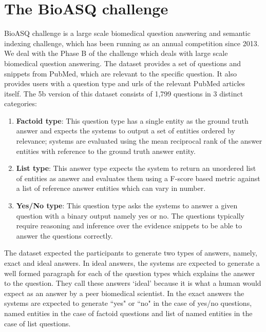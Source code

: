 \documentclass[11pt,a4paper]{article}
\begin{document}
\section{The BioASQ challenge}
\label{Dataset}
BioASQ challenge \cite{bioasq} is a large scale biomedical question answering and semantic indexing challenge, which has been running as an annual competition since 2013. %
We deal with the Phase B of the challenge which deals with large scale biomedical question answering. The dataset provides a set of questions and snippets from PubMed, which are relevant to the specific question. It also provides users with a question type and urls of the relevant PubMed articles itself. The 5b version of this dataset consists of 1,799 questions in 3 distinct categories:
\begin{enumerate}
    \item \textbf{Factoid type}: This question type has a single entity as the ground truth answer and expects the systems to output a set of  entities ordered by relevance; systems are evaluated using the mean reciprocal rank \cite{MRR} of the answer entities with reference to the ground truth answer entity.
    \item \textbf{List type}: This answer type expects the system to return an unordered list of entities as answer and evaluates them using a F-score based metric against a list of reference answer entities which can vary in number.
    \item \textbf{Yes/No type}: This question type asks the systems to answer a given question with a binary output namely yes or no. The questions typically require reasoning and inference over the evidence snippets to be able to answer the questions correctly.
\end{enumerate}

The dataset expected the participants to generate two types of answers, namely, exact and ideal answers. 
In ideal answers, the systems are expected to generate a well formed paragraph for each of the question types which explains the answer to the question. They call these answers `ideal' because it is what a human would expect as an answer by a peer biomedical scientist. In the exact answers the systems are expected to generate ``yes" or ``no" in the case of yes/no questions, named entities in the case of factoid questions and list of named entities in the case of list questions.
\end{document}
